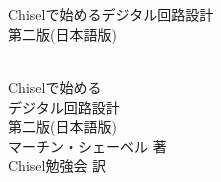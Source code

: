 \documentclass[%
    10pt,
    headinclude, footexclude,
    openright, %
    notitlepage,
    cleardoubleempty,
    headsepline,
    pointlessnumbers,
    bibtotoc, idxtotoc,
    ]{scrbook}
\newif\ifbook
\begin{document}
\ifbook
\else

\newpage
\thispagestyle{empty}
~
\newpage
\fi

\begin{flushleft}
\pagestyle{empty}
\ \\
\vspace{1cm}
{\mdseries\huge Chiselで始めるデジタル回路設計}
\ \\
\vspace{1cm}
{\mdseries\Large 第二版(日本語版)}
\cleardoublepage
\end{flushleft}
\newpage

\begin{flushleft}
\pagestyle{empty}
\ \\
\vspace{1cm}
{\Huge Chiselで始める\\デジタル回路設計\\
\bigskip
{\huge 第二版(日本語版)}\\
\bigskip
\bigskip
\bigskip
\bigskip
\bigskip
{\huge マーチン・シェーベル 著\\Chisel勉強会 訳}
\medskip\\
}

\newpage
\end{flushleft}
\end{document}
